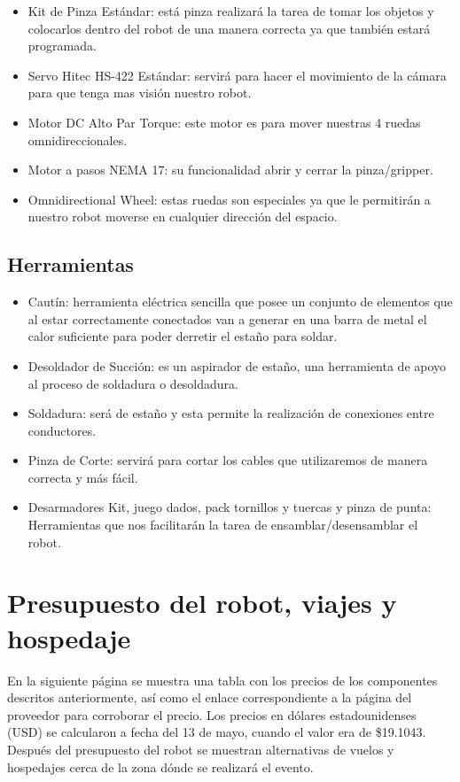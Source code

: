 \documentclass{article}
\begin{document}
\begin{itemize}
    \item Kit de Pinza Estándar: está pinza realizará la tarea de tomar los objetos y colocarlos dentro del robot de una manera correcta ya que también estará programada.
    \item Servo Hitec HS-422 Estándar: servirá para hacer el movimiento de la cámara para que tenga mas visión nuestro robot.
    \item Motor DC Alto Par Torque: este motor es para mover nuestras 4 ruedas omnidireccionales.
    \item Motor a pasos NEMA 17: su funcionalidad abrir y cerrar la pinza/gripper.
    \item Omnidirectional Wheel: estas ruedas son especiales ya que le permitirán a nuestro robot moverse en cualquier dirección del espacio.
\end{itemize}



\subsection{Herramientas}

\begin{itemize}
    \item Cautín: herramienta eléctrica sencilla que posee un conjunto de elementos que al estar correctamente conectados van a generar en una barra de metal el calor suficiente para poder derretir el estaño para soldar.
    \item Desoldador de Succión: es un aspirador de estaño, una herramienta de apoyo al proceso de soldadura o desoldadura.
    \item Soldadura: será de estaño y esta permite la realización de conexiones entre conductores.
    \item Pinza de Corte: servirá para cortar los cables que utilizaremos de manera correcta y más fácil.
    \item Desarmadores Kit, juego dados, pack tornillos y tuercas y pinza de punta: Herramientas que nos facilitarán la tarea de ensamblar/desensamblar el robot.
\end{itemize}


\section{Presupuesto del robot, viajes y hospedaje}

En la siguiente página se muestra una tabla con los precios de los componentes descritos anteriormente, así como el enlace correspondiente a la página del proveedor para corroborar el precio. Los precios en dólares estadounidenses (USD) se calcularon a fecha del 13 de mayo, cuando el valor era de \$19.1043.\\

Después del presupuesto del robot se muestran alternativas de vuelos y hospedajes cerca de la zona dónde se realizará el evento.


\begin{comment}
This text won't show up in the compiled pdf
this is just a multi-line comment. Useful
to, for instance, comment out slow-rendering parts
while working on a draft.
\end{comment}
 
\end{document}
